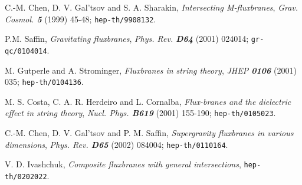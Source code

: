 \documentclass[a4paper,aps,nofootinbib,showpacs,preprint]{revtex4}
\begin{document}
\begin{thebibliography}{99}
    C.-M. Chen, D. V. Gal'tsov and S. A. Sharakin,
    {\sl Intersecting M-fluxbranes},
    {\it Grav. Cosmol. \bf 5} (1999) 45-48;
    {\tt hep-th/9908132}.

    P.M. Saffin,
    {\sl Gravitating fluxbranes},
    {\it Phys. Rev. \bf D64} (2001) 024014;
    {\tt gr-qc/0104014}.

    M. Gutperle and A. Strominger,
    {\sl Fluxbranes in string theory},
    {\it JHEP \bf 0106} (2001) 035;
    {\tt hep-th/0104136}.

    M. S. Costa, C. A. R. Herdeiro and L. Cornalba,
    {\sl Flux-branes and the dielectric effect in string theory},
    {\it Nucl. Phys. \bf B619} (2001) 155-190;
    {\tt hep-th/0105023}.

    C.-M. Chen, D. V. Gal'tsov and P. M. Saffin,
    {\sl Supergravity fluxbranes in various dimensions},
    {\it Phys. Rev. \bf D65} (2002) 084004;
    {\tt hep-th/0110164}.

    V. D. Ivashchuk,
    {\sl Composite fluxbranes with general intersections},
    {\tt hep-th/0202022}.

\end{thebibliography}
\end{document}
